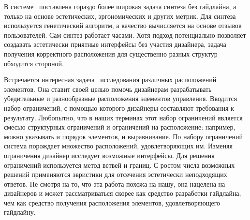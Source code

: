 
В системе~\cite{Grid} поставлена гораздо более широкая задача синтеза без гайдлайна, а только на основе эстетических, эргономических и других метрик.
Для синтеза используется генетический алгоритм, а качество вычисляется на основе отзывов пользователей. Сам синтез работает часами. Хотя подход потенциально позволяет создавать эстетически приятные интерфейсы без участия дизайнера, задача получения корректного расположения для существенно разных структур обходится стороной.


Встречается интересная задача~\cite{Scout} исследования различных расположений элементов. Она ставит своей целью помочь дизайнерам разрабатывать убедительные и разнообразные расположения элементов управления. Вводится набор ограничений, с помощью которого дизайнеры составляют требования к результату.
Любопытно, что в наших терминах этот набор ограничений является смесью структурных ограничений и ограничений на расположение: например, можно указывать и порядок элементов, и выравнивание. По набору ограничений система порождает множество расположений, удовлетворяющих им. Изменяя ограничения дизайнер исследует возможные интерфейсы.
Для решения ограничений используется метод ветвей и границ. С ростом числа возможных решений применяются эвристики для отсечения эстетически неподходящих ответов. Не смотря на то, что эта работа похожа на нашу, она нацелена на дизайнеров и может рассматриваться скорее как средство разработки гайдлайна, чем как средство получения расположения элементов, удовлетворяющего гайдлайну.


